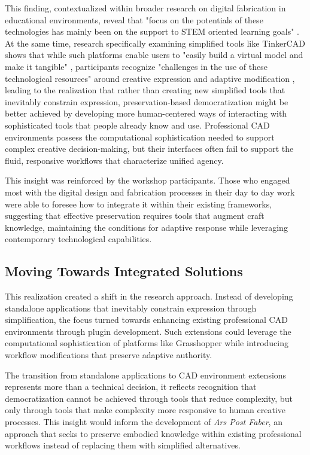This finding, contextualized within broader research on digital fabrication in educational environments, reveal that "focus on the potentials of these technologies has mainly been on the support to STEM oriented learning goals" \citep{smith2016}. At the same time, research specifically examining simplified tools like TinkerCAD shows that while such platforms enable users to "easily build a virtual model and make it tangible" \citep{barbosa2024}, participants recognize "challenges in the use of these technological resources" around creative expression and adaptive modification \citep{barbosa2024}, leading to the realization that rather than creating new simplified tools that inevitably constrain expression, preservation-based democratization might be better achieved by developing more human-centered ways of interacting with sophisticated tools that people already know and use. Professional CAD environments possess the computational sophistication needed to support complex creative decision-making, but their interfaces often fail to support the fluid, responsive workflows that characterize unified agency.

\vspace{0.5cm}

This insight was reinforced by the workshop participants. Those who engaged most with the digital design and fabrication processes in their day to day work were able to foresee how to integrate it within their existing frameworks, suggesting that effective preservation requires tools that augment craft knowledge, maintaining the conditions for adaptive response while leveraging contemporary technological capabilities.

\subsection{Moving Towards Integrated Solutions}

This realization created a shift in the research approach. Instead of developing standalone applications that inevitably constrain expression through simplification, the focus turned towards enhancing existing professional CAD environments through plugin development. Such extensions could leverage the computational sophistication of platforms like Grasshopper while introducing workflow modifications that preserve adaptive authority.

\vspace{0.5cm}

The transition from standalone applications to CAD environment extensions represents more than a technical decision, it reflects recognition that democratization cannot be achieved through tools that reduce complexity, but only through tools that make complexity more responsive to human creative processes. This insight would inform the development of \textit{Ars Post Faber}, an approach that seeks to preserve embodied knowledge within existing professional workflows instead of replacing them with simplified alternatives.

